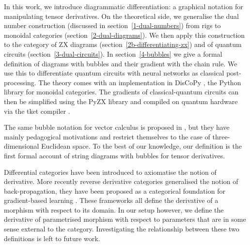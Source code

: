 In this work, we introduce diagrammatic differentiation: a graphical notation
for manipulating tensor derivatives. On the theoretical side, we generalise
the dual number construction (discussed in section~\ref{1-dual-numbers})
from rigs to monoidal categories (section~\ref{2-dual-diagrams}). We then apply
this construction to the category of ZX diagrams (section~\ref{2b-differentiating-zx})
and of quantum circuits (section~\ref{3-dual-circuits}). In section~\ref{4-bubbles}
we give a formal definition of diagrams with bubbles and their gradient with the
chain rule. We use this to differentiate quantum circuits with neural
networks as classical post-processing. The theory comes with an
implementation in DisCoPy \cite{DeFeliceEtAl20}, the Python library for
monoidal categories. The gradients of classical-quantum circuits can then
be simplified using the PyZX library \cite{KissingerVanDeWetering19} and compiled
on quantum hardware via the tket compiler \cite{SivarajahEtAl20}.

The same bubble notation for vector calculus is proposed in \cite{KimEtAl20},
but they have mainly pedagogical motivations and restrict themselves to the case
of three-dimensional Euclidean space. To the best of our knowledge, our
definition is the first formal account of string diagrams with bubbles for
tensor derivatives.

Differential categories \cite{BluteEtAl06} have been introduced to axiomatise
the notion of derivative. More recently reverse derivative categories
\cite{CockettEtAl19} generalised the notion of back-propagation, they have been
proposed as a categorical foundation for gradient-based learning
\cite{CruttwellEtAl21}. These frameworks all define the derivative
of a morphism with respect to its domain. In our setup however, we define
the derivative of parametrised morphism with respect to parameters that are
in some sense external to the category. Investigating the relationship between
these two definitions is left to future work.
